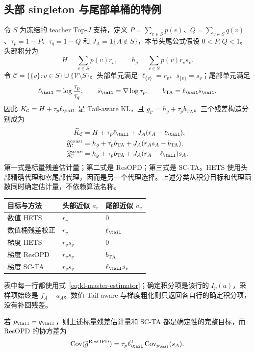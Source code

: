 \subsection{头部 singleton 与尾部单桶的特例}

令 $S$ 为冻结的 teacher Top-$J$ 支持，定义 $P=\sum_{v\in S}p(v)$、$Q=\sum_{v\in S}q(v)$、$\tau_p=1-P$、$\tau_q=1-Q$ 和 $J_A=\mathbf1\{A\notin S\}$，本节头尾公式假设 $0<P,Q<1$。头部积分为
\[
 H=\sum_{v\in S}p(v)r_v,\qquad h_g=\sum_{v\in S}p(v)r_vs_v.
\]
令 $\mathcal C=\{\{v\}:v\in S\}\cup\{\mathcal V\setminus S\}$。头部单元满足 $\ell_{\{v\}}=r_v$、$\bar s_{\{v\}}=s_v$；尾部单元满足
\[
 \ell_{\tail}=\log\frac{\tau_p}{\tau_q},\qquad
 \bar s_\tail=\nabla\log\tau_p,\qquad
 b_{\mathrm{TA}}=\ell_{\tail}\bar s_\tail.
\]
因此 $K_{\mathcal C}=H+\tau_p\ell_{\tail}$ 是 Tail-aware KL，且 $g_{\mathcal C}=h_g+\tau_pb_{\mathrm{TA}}$。三个残差构造分别成为
\begin{align*}
 \widehat K_{\mathcal C}
 &=H+\tau_p\ell_{\tail}+J_A(r_A-\ell_{\tail}),\\
 \widehat g_{\mathcal C}^{\mathrm{const}}
 &=h_g+\tau_pb_{\mathrm{TA}}+J_A(r_As_A-b_{\mathrm{TA}}),\\
 \widehat g_{\mathcal C}^{\mathrm{score}}
 &=h_g+\tau_pb_{\mathrm{TA}}+J_A(r_A-\ell_{\tail})s_A.
\end{align*}
第一式是标量残差估计量；第二式是 ResOPD；第三式是 SC-TA。HETS 使用头部精确代理和零尾部代理，因而是另一个代理选择。上述分类从积分目标和代理函数同时确定估计量，不依赖算法名称。

\begin{center}
\begin{tabular}{lll}
\toprule
目标与方法 & 头部近似 $a_v$ & 尾部近似 $a_v$\\
\midrule
数值 HETS & $r_v$ & $0$\\
数值桶残差校正 & $r_v$ & $\ell_{\tail}$\\
梯度 HETS & $r_vs_v$ & $0$\\
梯度 ResOPD & $r_vs_v$ & $b_{\mathrm{TA}}$\\
梯度 SC-TA & $r_vs_v$ & $\ell_{\tail}s_v$\\
\bottomrule
\end{tabular}
\end{center}
表中每一行都使用式~\eqref{eq:kl-master-estimator}；确定积分项是该行的 $I_p(a)$，采样项始终是 $f_A-a_A$。数值 Tail-aware 与梯度粗化则只返回各自行的确定积分项，没有补回残差。

\begin{proposition}
若 $p_\tail=q_\tail$，则上述标量残差估计量和 SC-TA 都是确定性的完整目标，而 ResOPD 的协方差为
\[
 \operatorname{Cov}(\widehat g^{\mathrm{ResOPD}})
 =\tau_p\ell_{\tail}^2\operatorname{Cov}_{p_\tail}(s_A).
\]
\end{proposition}

